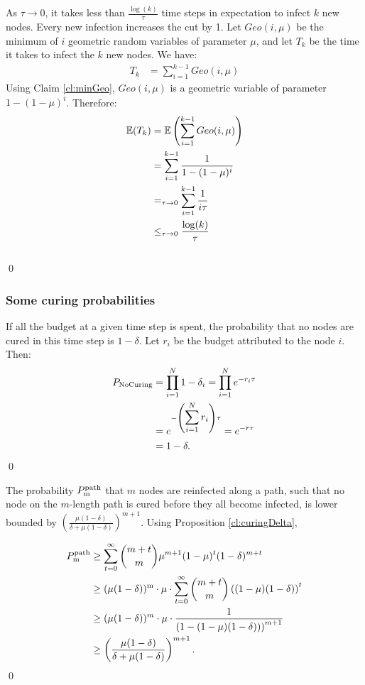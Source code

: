 \begin{lemma} \label{lem:infectionTime} 
As $\tau \to 0$, it takes less than $\frac{\log(k)}{\tau} $ time steps in expectation to infect $k$ new nodes.
\proof Every new infection increases the cut by 1. Let $Geo(i, \mu)$ be the minimum of $i$ geometric random variables of parameter $\mu$, and let $T_k$ be the time it takes to infect the $k$ new nodes. We have:
\begin{align*}
T_k &= \sum_{i=1}^{k-1} Geo(i, \mu)
\end{align*}
Using Claim \ref{cl:minGeo}, $Geo(i,\mu)$ is a geometric variable of parameter $1- (1-\mu)^i$. Therefore:
\begin{align*}
\mathbb{E}(T_k) &= \mathbb{E}\left(\sum_{i=1}^{k-1} Geo(i, \mu)\right) \\
&= \sum_{i=1}^{k-1} \frac{1}{1-(1-\mu)^i} \\
&=_{\tau \to 0} \sum_{i=1}^{k-1} \frac{1}{i\tau} \\ 
&\leq_{\tau \to 0} \frac{\log(k)}{\tau}
\end{align*}
\\\qed 
\end{lemma}

\subsubsection{Some curing probabilities}

\begin{proposition} \label{cl:curingDelta} 
	If all the budget at a given time step is spent, the probability that no nodes are cured in this time step is $1-\delta$.
	\proof Let $r_i$ be the budget attributed to the node $i$. Then:
	\begin{align*}
	P_{\rm NoCuring} &= \prod_{i=1}^{N} 1 - \delta_i = \prod_{i=1}^{N} e^{-r_i \tau} \\
	&= e^{-\left(\displaystyle\sum_{i=1}^{N} r_i \right) \tau} = e^{-r \tau} \\
	&= 1 - \delta.
	\end{align*}
	\qed 
\end{proposition}

\begin{lemma}\label{lem:Ppath} 
	The probability $P^{\rm path}_{\rm m}$ that $m$ nodes are reinfected along a path, such that no node on the $m$-length path is cured before they all become infected, is lower bounded by $\left(\frac{\mu (1-\delta)}{\delta + \mu (1-\delta)} \right)^{m+1}$.
	\proof Using Proposition \ref{cl:curingDelta}, 
	
	\begin{align*}
	P^{\rm path}_{\rm m} &\geq \sum_{t=0}^{\infty}  {m + t \choose m}  \mu^{m+1} (1-\mu)^t (1-\delta)^{m + t} \\
	&\geq (\mu (1-\delta))^{\rm m} \cdot \mu \cdot \sum_{t=0}^{\infty}  {m + t \choose m}   \left((1-\mu)(1-\delta)\right)^t \\
	&\geq (\mu (1-\delta))^{m} \cdot \mu \cdot \frac{1}{\left(1- (1-\mu)(1-\delta))\right)^{m+1}} \\
	&\geq \left(\frac{\mu (1-\delta)}{\delta + \mu (1-\delta)} \right)^{m+1}.
	\end{align*}
	\qed 
\end{lemma}

